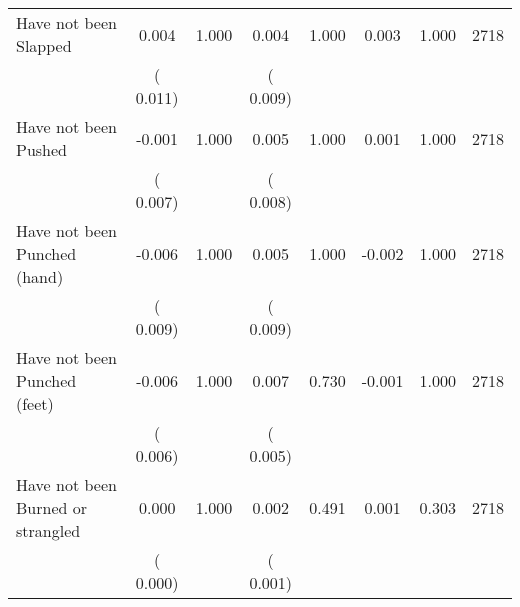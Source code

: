 \begin{tabular}{l*{7}{c}}
 Have not been Slapped       &              0.004       &        1.000  &              0.004       &        1.000  &              0.003       &              1.000 &  2718 \\ 
                       &       (       0.011)             &                               &       (       0.009)                     &                               &                                               &                                &                      \\ 

 Have not been Pushed       &             -0.001       &        1.000  &              0.005       &        1.000  &              0.001       &              1.000 &  2718 \\ 
                       &       (       0.007)             &                               &       (       0.008)                     &                               &                                               &                                &                      \\ 

 Have not been Punched (hand)       &             -0.006       &        1.000  &              0.005       &        1.000  &             -0.002       &              1.000 &  2718 \\ 
                       &       (       0.009)             &                               &       (       0.009)                     &                               &                                               &                                &                      \\ 

 Have not been Punched (feet)       &             -0.006       &        1.000  &              0.007       &        0.730  &             -0.001       &              1.000 &  2718 \\ 
                       &       (       0.006)             &                               &       (       0.005)                     &                               &                                               &                                &                      \\ 

 Have not been Burned or strangled       &              0.000       &        1.000  &              0.002       &        0.491  &              0.001       &              0.303 &  2718 \\ 
                       &       (       0.000)             &                               &       (       0.001)                     &                               &                                               &                                &                      \\ 


\end{tabular}
